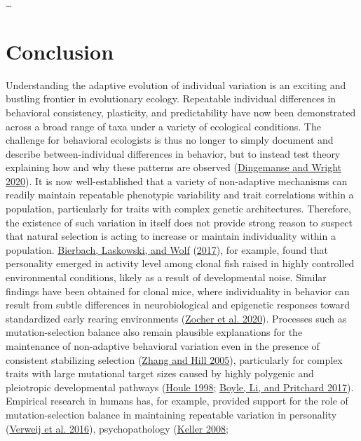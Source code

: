 \documentclass{article}
\begin{document}
\ldots{}

\hypertarget{conclusion}{%
\section{Conclusion}\label{conclusion}}

Understanding the adaptive evolution of individual variation is an
exciting and bustling frontier in evolutionary ecology. Repeatable
individual differences in behavioral consistency, plasticity, and
predictability have now been demonstrated across a broad range of taxa
under a variety of ecological conditions. The challenge for behavioral
ecologists is thus no longer to simply document and describe
between-individual differences in behavior, but to instead test theory
explaining how and why these patterns are observed
(\protect\hyperlink{ref-Ding2020}{Dingemanse and Wright 2020}). It is
now well-established that a variety of non-adaptive mechanisms can
readily maintain repeatable phenotypic variability and trait
correlations within a population, particularly for traits with complex
genetic architectures. Therefore, the existence of such variation in
itself does not provide strong reason to suspect that natural selection
is acting to increase or maintain individuality within a population.
\protect\hyperlink{ref-Bierbach2017}{Bierbach, Laskowski, and Wolf}
(\protect\hyperlink{ref-Bierbach2017}{2017}), for example, found that
personality emerged in activity level among clonal fish raised in highly
controlled environmental conditions, likely as a result of developmental
noise. Similar findings have been obtained for clonal mice, where
individuality in behavior can result from subtle differences in
neurobiological and epigenetic responses toward standardized early
rearing environments (\protect\hyperlink{ref-Zocher2020}{Zocher et al.
2020}). Processes such as mutation-selection balance also remain
plausible explanations for the maintenance of non-adaptive behavioral
variation even in the presence of consistent stabilizing selection
(\protect\hyperlink{ref-Zhang2005}{Zhang and Hill 2005}), particularly
for complex traits with large mutational target sizes caused by highly
polygenic and pleiotropic developmental pathways
(\protect\hyperlink{ref-Houle1998}{Houle 1998};
\protect\hyperlink{ref-Boyle2017}{Boyle, Li, and Pritchard 2017}).
Empirical research in humans has, for example, provided support for the
role of mutation-selection balance in maintaining repeatable variation
in personality (\protect\hyperlink{ref-Verw2012}{Verweij et al. 2016}),
psychopathology (\protect\hyperlink{ref-Keller2008}{Keller 2008};
\end{document}
